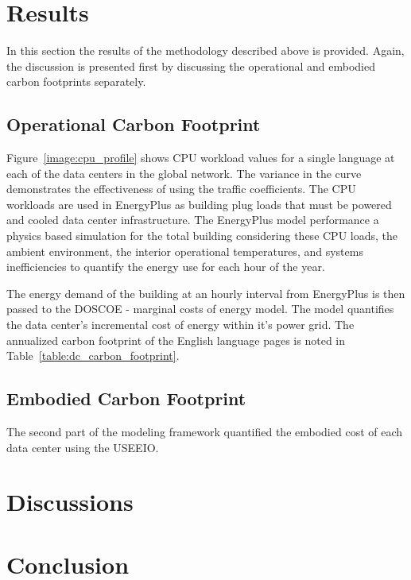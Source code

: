         

\section{Results}
    In this section the results of the methodology described above is provided. Again, the discussion is presented first by discussing the operational and embodied carbon footprints separately. 
    
    \subsection{Operational Carbon Footprint}
    Figure~\ref{image:cpu_profile} shows CPU workload values for a single language at each of the data centers in the global network. The variance in the curve demonstrates the effectiveness of using the traffic coefficients. The CPU workloads are used in EnergyPlus as building plug loads that must be powered and cooled data center infrastructure. The EnergyPlus model performance a physics based simulation for the total building considering these CPU loads, the ambient environment, the interior operational temperatures, and systems inefficiencies to quantify the energy use for each hour of the year.
    

    
    
    The energy demand of the building at an hourly interval from EnergyPlus is then passed to the DOSCOE - marginal costs of energy model. The model quantifies the data center's incremental cost of energy within it's power grid. The annualized carbon footprint of the English language pages is noted in Table~\ref{table:dc_carbon_footprint}.

    
    
    \subsection{Embodied Carbon Footprint}
    The second part of the modeling framework quantified the embodied cost of each data center using the USEEIO. 
    
    
    
    

    
    
    
\section{Discussions}
\section{Conclusion}

    

        